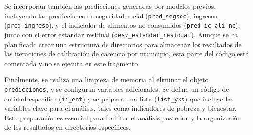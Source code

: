\documentclass[
  12pt,
]{book}
\begin{document}
Se incorporan también las predicciones generadas por modelos previos, incluyendo las predicciones de seguridad social (\texttt{pred\_segsoc}), ingresos (\texttt{pred\_ingreso}), y el indicador de alimentos no consumidos (\texttt{pred\_ic\_ali\_nc}), junto con el error estándar residual (\texttt{desv\_estandar\_residual}). Aunque se ha planificado crear una estructura de directorios para almacenar los resultados de las iteraciones de calibración de carencia por municipio, esta parte del código está comentada y no se ejecuta en este fragmento.

Finalmente, se realiza una limpieza de memoria al eliminar el objeto \texttt{predicciones}, y se configuran variables adicionales. Se define un código de entidad específico (\texttt{ii\_ent}) y se prepara una lista (\texttt{list\_yks}) que incluye las variables clave para el análisis, tales como indicadores de pobreza y bienestar. Esta preparación es esencial para facilitar el análisis posterior y la organización de los resultados en directorios específicos.
\end{document}
